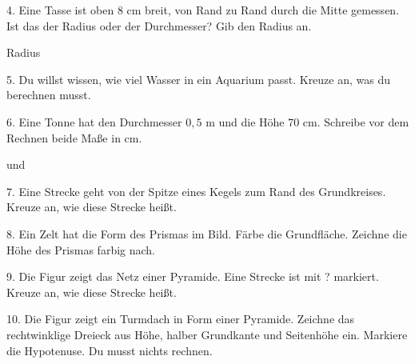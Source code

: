 \documentclass[11pt]{article}
\begin{document}
\begin{pfaufg}{}{4.}{}
Eine Tasse ist oben $8$ cm breit, von Rand zu Rand durch die Mitte gemessen. Ist das der Radius oder der Durchmesser? Gib den Radius an.
\par\noindent Radius \leerfeld[cm] \par
{}
\end{pfaufg}
\begin{pfaufg}{}{5.}{}
Du willst wissen, wie viel Wasser in ein Aquarium passt. Kreuze an, was du berechnen musst.
\end{pfaufg}
\begin{pfaufg}{}{6.}{}
Eine Tonne hat den Durchmesser $0{,}5$ m und die Höhe $70$ cm. Schreibe vor dem Rechnen beide Maße in cm.
\par\noindent \leerfeld[cm]  und \leerfeld[cm] \par
{}
\end{pfaufg}
\begin{pfaufg}{}{7.}{}
Eine Strecke geht von der Spitze eines Kegels zum Rand des Grundkreises. Kreuze an, wie diese Strecke heißt.
\end{pfaufg}
\begin{pfaufg}{}{8.}{}
Ein Zelt hat die Form des Prismas im Bild. Färbe die Grundfläche. Zeichne die Höhe des Prismas farbig nach.
\par\smallskip\noindent {}\par
{}
\end{pfaufg}
\begin{pfaufg}{}{9.}{}
Die Figur zeigt das Netz einer Pyramide. Eine Strecke ist mit ? markiert. Kreuze an, wie diese Strecke heißt.
\par\smallskip\noindent {}\par
{}
\end{pfaufg}
\begin{pfaufg}{}{10.}{}
Die Figur zeigt ein Turmdach in Form einer Pyramide. Zeichne das rechtwinklige Dreieck aus Höhe, halber Grundkante und Seitenhöhe ein. Markiere die Hypotenuse. Du musst nichts rechnen.
\par\smallskip\noindent {}\par
{}
\end{pfaufg}
\end{document}
